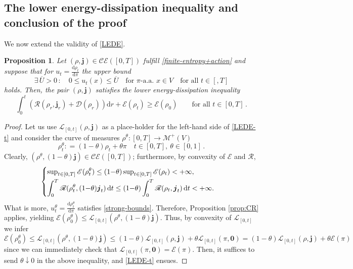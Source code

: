 \documentclass[11pt,reqno]{amsart}
\numberwithin{equation}{section}
\newcommand{\CE}[2]{\calC \calE([#1,#2])}
\newcommand{\calC}{\mathcal{C}}
\newcommand{\calE}{\mathcal{E}}
\newcommand{\calM}{\mathcal{M}}
\newcommand{\dd}{\mathrm{d}}
\newtheorem{proposition}[theorem]{Proposition}
\theoremstyle{definition}
\def\dd{\mathrm{d}}
\def\calS{\mathscr E}
\newcommand{\bj}{{\boldsymbol j}}
\newcommand{\scrR}{\mathscr{R}}
\newcommand{\scrD}{\mathscr{D}}
\newcommand{\scrE}{\mathscr{E}}
\newcommand{\jj}{{\boldsymbol{j}}}
\numberwithin{equation}{section}
\begin{document}
\subsection{The lower energy-dissipation inequality and conclusion of the proof}
We now extend the validity of \eqref{LEDE}.
\begin{proposition}
\label{prop:LEDE}
 Let $(\rho,\jj)\in\CE 0T$ fulfill \eqref{finite-entropy+action} 
and suppose that for $u_t = \frac{\dd \rho_t}{\dd \pi}$ the upper bound
\[
\exists\, \overline U>0 \, : \quad 0 \leq  u_t(x) \leq \overline U \quad \text{for } \pi\text{-a.a. } x \in V \quad \text{for all } t \in [,T]
\]
holds.
Then, the pair $(\rho,\jj)$ satisfies the lower energy-dissipation inequality 
\begin{equation}
\label{LEDE-t}
\int_0^t  \left(  \scrR(\rho_r,\jj_r) + \scrD(\rho_r) \right) \dd r + \calS(\rho_t)  \geq   \calS(\rho_0) \qquad\text{for all } t \in [0,T]\,.
\end{equation}
\end{proposition}
\begin{proof}
Let us use $\mathcal{L}_{[0,t]}(\rho,\jj) $ as a place-holder for the left-hand side of \eqref{LEDE-t} and consider the curve of measures
$\rho^\theta: [0,T] \to\calM^+(V)$
\[
\rho_t^\theta: = (1{-}\theta)\rho_t+ \theta \pi \quad t \in [0,T], \ \theta \in [0,1]\,. 
\]
Clearly, $(\rho^\theta, (1{-}\theta) \jj) \in \CE 0T$; furthermore, by convexity of $\calS$ and $\scrR$, 
\[
\begin{cases}
\displaystyle     \sup\nolimits_{t\in [0,T]} \scrE(\rho_t^\theta) \leq (1{-}\theta)   \sup\nolimits_{t\in [0,T]} \scrE(\rho_t)<+\infty,
\smallskip
\\
\displaystyle  \int_0^T \scrR(\rho_t^\theta, (1{-}\theta) \bj_t)\, \dd t \leq (1{-}\theta)\int_0^T \scrR(\rho_t, \bj_t)\, \dd t <+\infty.
\end{cases}
\]
What is more, $u_t^\theta =\frac{\dd \rho_t^\theta}{\dd \pi} $ satisfies \eqref{strong-bounds}. Therefore, Proposition \ref{prop:CR} applies, yielding 
$  \calS(\rho_0^\theta) \leq \mathcal{L}_{[0,t]}(\rho^\theta, (1{-}\theta)\jj)$. Thus, by convexity of $ \mathcal{L}_{[0,t]}$ we infer
\[
 \calS(\rho_0^\theta) \leq \mathcal{L}_{[0,t]}(\rho^\theta, (1{-}\theta)\jj) \leq (1{-}\theta) \mathcal{L}_{[0,t]}(\rho, \jj) + \theta \mathcal{L}_{[0,t]}(\pi, \boldsymbol{0}) = (1{-}\theta) \mathcal{L}_{[0,t]}(\rho, \jj)  +\theta  \calS(\pi)
\]
since we can immediately check that $ \mathcal{L}_{[0,t]}(\pi, \boldsymbol{0}) = \calS(\pi)$. Then, it suffices to send $\theta \downarrow 0$ in the above inequality, and \eqref{LEDE-t} ensues.
\end{proof}
\end{document}
